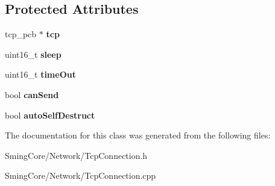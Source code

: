 \subsection*{Protected Attributes}
\begin{DoxyCompactItemize}
\item 
\hypertarget{class_tcp_connection_a601e019508b0071d0825908eaee0f58c}{}tcp\+\_\+pcb $\ast$ {\bfseries tcp}\label{class_tcp_connection_a601e019508b0071d0825908eaee0f58c}

\item 
\hypertarget{class_tcp_connection_a482c5afdb16d0a93c46a8b83da649254}{}uint16\+\_\+t {\bfseries sleep}\label{class_tcp_connection_a482c5afdb16d0a93c46a8b83da649254}

\item 
\hypertarget{class_tcp_connection_a3d11a5464ae92193779dafc650597fa2}{}uint16\+\_\+t {\bfseries time\+Out}\label{class_tcp_connection_a3d11a5464ae92193779dafc650597fa2}

\item 
\hypertarget{class_tcp_connection_a730b80fbbafb4ac92eda9b320ccf7bbf}{}bool {\bfseries can\+Send}\label{class_tcp_connection_a730b80fbbafb4ac92eda9b320ccf7bbf}

\item 
\hypertarget{class_tcp_connection_a56f9a3c4c74d221c29e07107384db1c1}{}bool {\bfseries auto\+Self\+Destruct}\label{class_tcp_connection_a56f9a3c4c74d221c29e07107384db1c1}

\end{DoxyCompactItemize}


The documentation for this class was generated from the following files\+:\begin{DoxyCompactItemize}
\item 
Sming\+Core/\+Network/Tcp\+Connection.\+h\item 
Sming\+Core/\+Network/Tcp\+Connection.\+cpp\end{DoxyCompactItemize}
